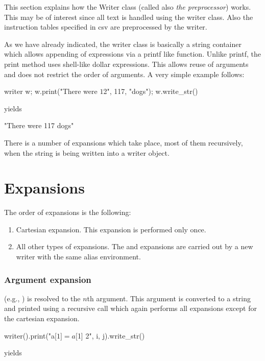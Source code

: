 \label{sec:preprocessor}
This section explains how the Writer class (called also \emph{the preprocessor}) works. This may be of interest since all text is handled using the writer class. Also the instruction tables specified in csv are preprocessed by the writer.

As we have already indicated, the writer class is basically a string container which allows appending of expressions via a printf like function. Unlike printf, the print method uses shell-like dollar expressions. This allows reuse of arguments and does not restrict the order of arguments. A very simple example follows:

\mybeginfig
\begin{code}
writer w;
w.print("There were $1 $2", 117, "dogs");
w.write_str()
\end{code}
yields
\begin{code}
"There were 117 dogs"
\end{code}

There is a number of expansions which take place, most of them recursively, when the string is being written into a writer object.

\section*{Expansions}

The order of expansions is the following:
\begin{enumerate}
\item Cartesian expansion. This expansion is performed only once.
\item All other types of expansions. The \ttt{\$\string{\string}} and \ttt{\$[]} expansions are carried out by a new writer with the same alias environment.
\end{enumerate}

\subsubsection{Argument expansion}

 (e.g., ) is resolved to the $n$th argument. This argument is converted to a string and printed using a recursive call which again performs all expansions except for the cartesian expansion.

\mybeginfig
\begin{code}
writer().print("a[$1] = a[$1] $ $2", i, j).write_str()
\end{code}
yields


